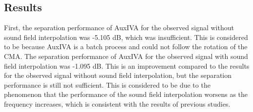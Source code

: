 \documentclass[twocolumn,9pt,dvipdfmx]{article}
\begin{document}
\subsection{Results}
First, the separation performance of AuxIVA for the observed signal without sound field interpolation was -5.105 dB, which was insufficient.
This is considered to be because AuxIVA is a batch process and could not follow the rotation of the CMA.
The separation performance of AuxIVA for the observed signal with sound field interpolation was -1.095 dB.
This is an improvement compared to the results for the observed signal without sound field interpolation, but the separation performance is still not sufficient.
This is considered to be due to the phenomenon that the performance of the sound field interpolation worsens as the frequency increases, which is consistent with the results of previous studies.

\end{document}
